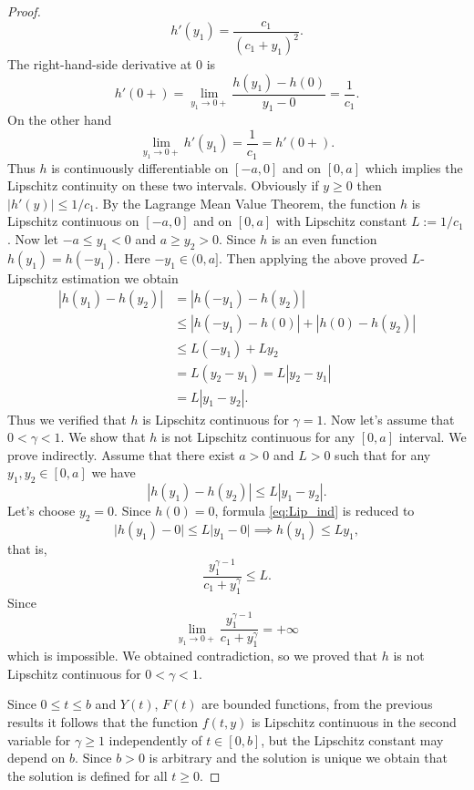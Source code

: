 \documentclass[pdflatex,sn-mathphys-num]{sn-jnl}
\theoremstyle{thmstyleone}
\theoremstyle{thmstyletwo}
\theoremstyle{thmstylethree}
\begin{document}
\begin{proof}
\begin{equation}
    h'(y_1)=\frac{c_1}{(c_1+y_1)^2}.
\end{equation}
The right-hand-side derivative at $0$ is
\begin{equation}
    h'(0+)=\lim_{y_1 \to 0+} \frac{h(y_1)-h(0)}{y_1-0}=\frac{1}{c_1}.
\end{equation}
On the other hand
\begin{equation}
    \lim_{y_1 \to 0+} h'(y_1)=\frac{1}{c_1}=h'(0+).
\end{equation}
Thus $h$ is continuously differentiable on $[-a,0]$ and on 
 $[0,a]$ which implies the Lipschitz continuity on these two intervals. Obviously if 
 $y\geq 0$ then $|h'(y)|\leq 1/c_1$. By the Lagrange Mean Value Theorem, the function $h$ 
 is Lipschitz continuous on $[-a,0]$ and on $[0,a]$ with Lipschitz constant $L:=1/c_1$. Now let 
$-a\leq y_1<0$ and $a\geq y_2>0$. Since $h$ is an even function $h(y_1)=h(-y_1)$. Here $-y_1\in (0,a]$. 
Then applying the above proved $L$-Lipschitz estimation we obtain
\begin{align*}
    |h(y_1)-h(y_2)| &=|h(-y_1)-h(y_2)| \\
                    &\leq |h(-y_1)-h(0)|+|h(0)-h(y_2)| \\
                    &\leq L (-y_1)+ L y_2 \\
                    &= L(y_2-y_1)=L|y_2-y_1| \\
                    &= L|y_1-y_2|.
\end{align*}
Thus we verified that $h$ is Lipschitz continuous for $\gamma=1$. Now let’s assume that $0<\gamma<1$. 
We show that $h$ is not Lipschitz continuous for any $[0,a]$ interval. We prove indirectly. 
Assume that there exist $a>0$ and $L>0$ such that for any $y_1,y_2\in [0,a]$ we have
\begin{equation}\label{eq:Lip_ind}
    |h(y_1)-h(y_2)|\leq L |y_1-y_2|.
\end{equation}
Let’s choose $y_2=0$. Since $h(0)=0$, formula \eqref{eq:Lip_ind} is reduced to 
\begin{equation*}
    \vert{}h(y_1) - 0\vert{} \le L \vert{}y_1 - 0\vert{} \implies h(y_1) \le L y_1,
\end{equation*}
that is,
\begin{equation*}
    \frac{y_1^{\gamma - 1}}{c_1 + y_1^\gamma} \leq L.
\end{equation*}
Since
\begin{equation*}
    \lim_{y_1\to 0+} \frac{y_1^{\gamma - 1}}{c_1 + y_1^\gamma}=+\infty
\end{equation*}
which is impossible. We obtained contradiction, so we proved that $h$ is 
not Lipschitz continuous for $0<\gamma<1$. 
 
Since $0\leq t\leq b$ and $Y(t)$, $F(t)$ are bounded functions, 
from the previous results it follows that the function $f(t,y)$ 
is Lipschitz continuous in the second variable for $\gamma\geq 1$ independently of  $t\in [0,b]$, 
but the Lipschitz constant may depend on $b$. 
Since $b>0$ is arbitrary and the solution is unique we obtain that the solution is 
defined for all $t\geq 0$. 
\end{proof}
\end{document}
